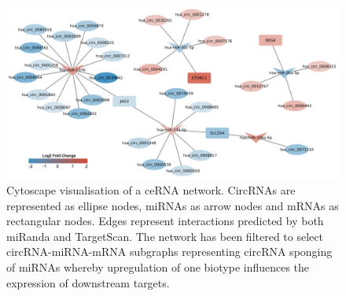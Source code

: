\documentclass[journal,review,submit,pdftex,moreauthors]{Definitions/mdpi}
\begin{document}
\begin{figure}
    \begin{center}
        \includegraphics[width=\textwidth]{network.png}
        \caption{Cytoscape visualisation of a ceRNA network. CircRNAs are represented as ellipse nodes, miRNAs as arrow nodes and mRNAs as rectangular nodes. Edges represent interactions predicted by both miRanda and TargetScan. The network has been filtered to select circRNA-miRNA-mRNA subgraphs representing circRNA sponging of miRNAs whereby upregulation of one biotype influences the expression of downstream targets.}
        \label{network}
    \end{center}
\end{figure}
\end{document}
